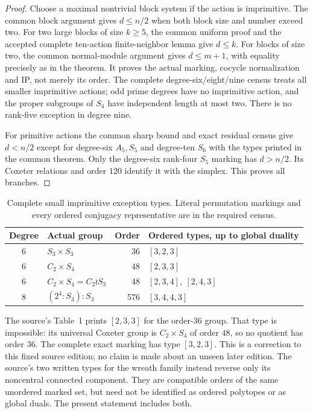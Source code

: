 \documentclass[11pt]{article}
\begin{document}
\begin{proof}
Choose a maximal nontrivial block system if the action is imprimitive.
The common block argument gives $d\leq n/2$ when both block size and
number exceed two. For two large blocks of size $k\geq5$, the common
uniform proof and the accepted complete ten-action finite-neighbor lemma
give $d\leq k$. For blocks of size two, the common normal-module argument
gives $d\leq m+1$, with equality precisely as in the theorem. It proves
the actual marking, cocycle normalization and IP, not merely its order.
The complete degree-six/eight/nine census treats all smaller imprimitive
actions; odd prime degrees have no imprimitive action, and the proper
subgroups of $S_4$ have independent length at most two. There is no
rank-five exception in degree nine.

For primitive actions the common sharp bound and exact residual census
give $d<n/2$ except for degree-six $A_5,S_5$ and degree-ten $S_6$ with
the types printed in the common theorem. Only the degree-six rank-four
$S_5$ marking has $d>n/2$. Its Coxeter relations and order $120$ identify
it with the simplex. This proves all branches.
\end{proof}

\begin{table}[ht]\centering
\begin{tabular}{clrl}
\toprule
Degree & Actual group & Order & Ordered types, up to global duality\\
\midrule
6&$S_3\times S_3$&36&$[3,2,3]$\\
6&$C_2\times S_4$&48&$[2,3,3]$\\
6&$C_2\times S_4=C_2\wr S_3$&48&$[2,3,4],\ [2,4,3]$\\
8&$(2^4:S_3):S_3$&576&$[3,4,4,3]$\\
\bottomrule
\end{tabular}
\caption{Complete small imprimitive exception types. Literal permutation
markings and every ordered conjugacy representative are in the required census.}
\end{table}

The source's Table~1 prints $[2,3,3]$ for the order-$36$ group.
That type is impossible: its universal Coxeter group is $C_2\times S_4$
of order $48$, so no quotient has order $36$. The complete exact marking
has type $[3,2,3]$. This is a correction to this fixed source edition;
no claim is made about an unseen later edition.
The source's two written types for the wreath family instead reverse
only its noncentral connected component. They are compatible orders
of the same unordered marked set, but need not be identified as ordered
polytopes or as global duals. The present statement includes both.
\end{document}
